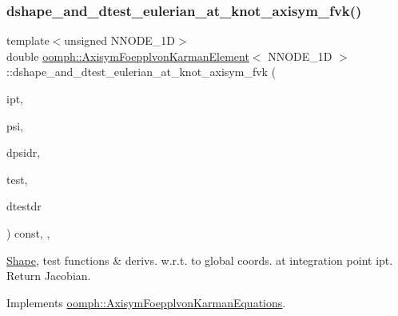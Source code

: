\subsubsection{\texorpdfstring{dshape\+\_\+and\+\_\+dtest\+\_\+eulerian\+\_\+at\+\_\+knot\+\_\+axisym\+\_\+fvk()}{dshape\_and\_dtest\_eulerian\_at\_knot\_axisym\_fvk()}\hspace{0.1cm}{\footnotesize\ttfamily [1/2]}}
{\footnotesize\ttfamily template$<$unsigned N\+N\+O\+D\+E\+\_\+1D$>$ \\
double \hyperlink{classoomph_1_1AxisymFoepplvonKarmanElement}{oomph\+::\+Axisym\+Foepplvon\+Karman\+Element}$<$ N\+N\+O\+D\+E\+\_\+1D $>$\+::dshape\+\_\+and\+\_\+dtest\+\_\+eulerian\+\_\+at\+\_\+knot\+\_\+axisym\+\_\+fvk (\begin{DoxyParamCaption}\item[{const unsigned \&}]{ipt,  }\item[{\hyperlink{classoomph_1_1Shape}{Shape} \&}]{psi,  }\item[{\hyperlink{classoomph_1_1DShape}{D\+Shape} \&}]{dpsidr,  }\item[{\hyperlink{classoomph_1_1Shape}{Shape} \&}]{test,  }\item[{\hyperlink{classoomph_1_1DShape}{D\+Shape} \&}]{dtestdr }\end{DoxyParamCaption}) const\hspace{0.3cm}{\ttfamily [inline]}, {\ttfamily [protected]}, {\ttfamily [virtual]}}



\hyperlink{classoomph_1_1Shape}{Shape}, test functions \& derivs. w.\+r.\+t. to global coords. at integration point ipt. Return Jacobian. 



Implements \hyperlink{classoomph_1_1AxisymFoepplvonKarmanEquations_a456a9c27c326d6d1e55e3ab822ac1a5f}{oomph\+::\+Axisym\+Foepplvon\+Karman\+Equations}.

\mbox{\label{classoomph_1_1AxisymFoepplvonKarmanElement_a20841d263ec4590d5614d43f2f813ae7}} 
